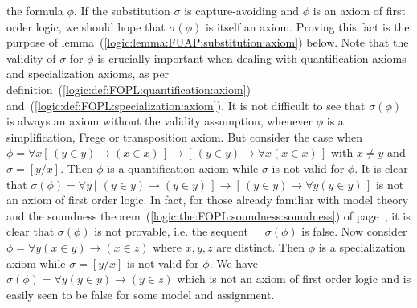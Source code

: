 the formula $\phi$. If the substitution $\sigma$ is capture-avoiding
and $\phi$ is an axiom of first order logic, we should hope that
$\sigma(\phi)$ is itself an axiom. Proving this fact is the purpose
of lemma~(\ref{logic:lemma:FUAP:substitution:axiom}) below. Note
that the validity of $\sigma$ for $\phi$ is crucially important when
dealing with quantification axioms and specialization axioms, as per
definition~(\ref{logic:def:FOPL:quantification:axiom})
and~(\ref{logic:def:FOPL:specialization:axiom}). It is not difficult
to see that $\sigma(\phi)$ is always an axiom without the validity
assumption, whenever $\phi$ is a simplification, Frege or
transposition axiom. But consider the case when $\phi=\forall
x[\,(y\in y)\to(x\in x)\,]\to[\,(y\in y)\to\forall x(x\in x)\,]$
with $x\neq y$ and $\sigma=[y/x]$. Then $\phi$ is a quantification
axiom while $\sigma$ is not valid for $\phi$. It is clear that
$\sigma(\phi)=\forall y[\,(y\in y)\to(y\in y)\,]\to[\,(y\in
y)\to\forall y(y\in y)\,]$ is not an axiom of first order logic. In
fact, for those already familiar with model theory and the soundness
theorem~(\ref{logic:the:FOPL:soundness:soundness}) of
page~\pageref{logic:the:FOPL:soundness:soundness}, it is clear that
$\sigma(\phi)$ is not provable, i.e. the sequent
$\vdash\sigma(\phi)$ is false. Now consider $\phi=\forall y(x\in
y)\to(x\in z)$ where $x,y,z$ are distinct. Then $\phi$ is a
specialization axiom while $\sigma=[y/x]$ is not valid for $\phi$.
We have $\sigma(\phi)=\forall y(y\in y)\to(y\in z)$ which is not an
axiom of first order logic and is easily seen to be false for some
model and assignment.

